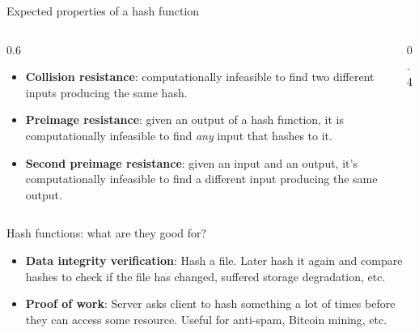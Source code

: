 \ifdefined\PRESENTATION\else\PassOptionsToClass{handout}{beamer}\fi\documentclass[aspectratio=169, lualatex]{beamer}
\begin{document}
\begin{frame}{Expected properties of a hash function}
	\begin{columns}[c]
		\begin{column}{0.6\textwidth}
			\begin{itemize}
				\item \textbf{Collision resistance}: computationally infeasible to find
				      two different inputs producing the same hash.
				\item \textbf{Preimage resistance}: given an output of a hash function,
				      it is computationally infeasible to find \emph{any} input that hashes to it.
				\item \textbf{Second preimage resistance}: given an input and an output,
				      it's computationally infeasible to find a different input
				      producing the same output.
			\end{itemize}
		\end{column}
		\begin{column}{0.4\textwidth}
		\end{column}
	\end{columns}
\end{frame}

\begin{frame}{Hash functions: what are they good for?}
	\begin{itemize}
		\item \textbf{Data integrity verification}: Hash a file. Later hash it
		      again and compare hashes to check if the file has changed, suffered storage
		      degradation, etc.
		\item \textbf{Proof of work}: Server asks client to hash something a lot of
		      times before they can access some resource. Useful for anti-spam, Bitcoin
		      mining, etc.
	\end{itemize}
\end{frame}
\end{document}
